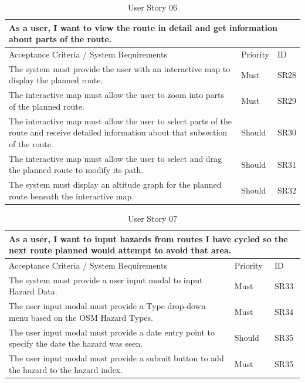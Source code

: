 \begin{table}[!htb]
\caption{User Story 06}
\label{tab:user-story-06}
\begin{tabular}{ p{8cm} p{1cm}  p{1cm} }
\hline
\multicolumn{3}{p{13cm}}{As a user, I want to view the route in detail and get information about parts of the route.}\\ 
\hline
Acceptance Criteria / System Requirements & Priority & ID\\
\hline
The system must provide the user with an interactive map to display the planned route. & Must & SR28 \\
The interactive map must allow the user to zoom into parts of the planned route. & Must & SR29\\
The interactive map must allow the user to select parts of the route and receive detailed information about that subsection of the route. & Should & SR30\\
The interactive map must allow the user to select and drag the planned route to modify its path. & Should & SR31\\ 
The system must display an altitude graph for the planned route beneath the interactive map. & Should & SR32\\ 
\hline
\end{tabular}
\end{table}

\begin{table}[!htb]
\caption{User Story 07}
\label{tab:user-story-07}
\begin{tabular}{ p{8cm} p{1cm}  p{1cm} }
\hline
\multicolumn{3}{p{13cm}}{As a user, I want to input hazards from routes I have cycled so the next route planned would attempt to avoid that area.}\\ 
\hline
Acceptance Criteria / System Requirements & Priority & ID\\
\hline
The system must provide a user input modal to input Hazard Data. & Must & SR33 \\
The user input modal must provide a Type drop-down menu based on the OSM Hazard Types. & Must & SR34\\
The user input modal must provide a date entry point to specify the date the hazard was seen. & Should & SR35\\
The user input modal must provide a submit button to add the hazard to the hazard index. & Must & SR35\\ 
\hline
\end{tabular}
\end{table}

